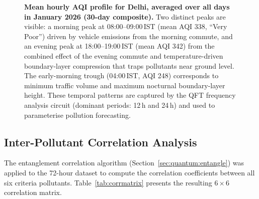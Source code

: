 \documentclass[12pt,a4paper]{article}
\begin{document}
\begin{figure}[H]
\centering
{}
\caption[Diurnal AQI profile for Delhi (January 2026)]{%
  \textbf{Mean hourly AQI profile for Delhi, averaged over all days in
  January 2026 (30-day composite).}
  Two distinct peaks are visible: a morning peak at 08:00--09:00\,IST
  (mean AQI 338, ``Very Poor'') driven by vehicle emissions from the
  morning commute, and an evening peak at 18:00--19:00\,IST (mean AQI 342)
  from the combined effect of the evening commute and temperature-driven
  boundary-layer compression that traps pollutants near ground level.
  The early-morning trough (04:00\,IST, AQI 248) corresponds to minimum
  traffic volume and maximum nocturnal boundary-layer height. These temporal
  patterns are captured by the QFT frequency analysis circuit (dominant
  periods: 12\,h and 24\,h) and used to parameterise pollution forecasting.}
\label{fig:diurnal}
\end{figure}

\subsection{Inter-Pollutant Correlation Analysis}
\label{sec:results:correlation}

The entanglement correlation algorithm (Section~\ref{sec:quantum:entangle})
was applied to the 72-hour dataset to compute the correlation coefficients
between all six criteria pollutants. Table~\ref{tab:corrmatrix} presents
the resulting $6 \times 6$ correlation matrix.
\end{document}
